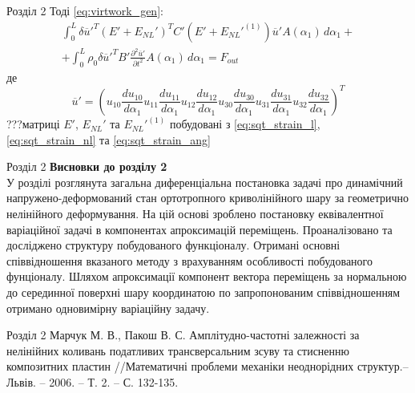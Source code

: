 \documentclass[8pt]{beamer}
\numberwithin{figure}{section}
\numberwithin{equation}{section}
\begin{document}
\begin{frame}{Розділ 2}
Тоді \eqref{eq:virtwork_gen}:
\begin{multline}
\int_0^L \delta\overline{u}'^T \left( E' + E_{NL}' \right)^T C' \left( E' + E_{NL}'^{(1)} \right)\overline{u}' A\left(\alpha_1\right)\, d\alpha_1+\\+\int_0^L \rho_0 \delta\overline{u}'^T B'\frac{\partial^2 \overline{u}'}{\partial t^2} A\left(\alpha_1\right)\, d\alpha_1=F_{out}
\end{multline}
де
\[
\overline{u}' = \left( u_{10}
\frac { du_{10}} { d \alpha_1}
u_{11} 
\frac { du_{11}} { d \alpha_1}
u_{12}
\frac { du_{12}} { d \alpha_1} 
u_{30}
\frac { du_{30}} { d \alpha_1}
u_{31} 
\frac { du_{31}} { d \alpha_1}
u_{32}
\frac { du_{32}} { d \alpha_1} 
\right)^T
\]
???матриці $E'$, $E_{NL}'$ та $E_{NL}'^{(1)}$ побудовані з \eqref{eq:sqt_strain_l}, \eqref{eq:sqt_strain_nl} та \eqref{eq:sqt_strain_ang}

\end{frame}
\begin{frame}{Розділ 2}
\textbf{Висновки до розділу 2}\\
\vspace{1em}
У розділі розглянута загальна диференціальна постановка задачі про динамічний напружено-деформований стан ортотропного криволінійного шару за геометрично нелінійного деформування. На цій основі зроблено постановку еквівалентної варіаційної задачі в компонентах апроксимацій переміщень. Проаналізовано та досліджено структуру побудованого функціоналу. Отримані основні співвідношення вказаного методу з врахуванням особливості побудованого фунціоналу. Шляхом апроксимації компонент вектора переміщень за нормальною до серединної поверхні шару координатою по запропонованим співвідношенням отримано одновимірну варіаційну задачу. 

\end{frame}


\begin{frame}{Розділ 2}
Марчук М. В., Пакош В. С. Амплітудно-частотні залежності за нелінійних коливань податливих трансверсальним зсуву та стисненню композитних пластин //Математичні проблеми механіки неоднорідних структур.–Львів. – 2006. – Т. 2. – С. 132-135.

\end{frame}
\end{document}
